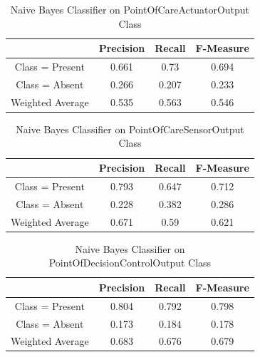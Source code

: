 \documentclass[11pt, notitlepage,abstracton,oneside]{article}   	%
\begin{document}
\begin{table}[H]
    \caption{Naive Bayes Classifier on PointOfCareActuatorOutput Class}
        \begin{center}
        \begin{tabular}{|c|c|c|c|}
            \hline
            & Precision & Recall & F-Measure \\ \hline
            Class = Present & 0.661 & 0.73 & 0.694 \\ \hline
            Class = Absent & 0.266 & 0.207 & 0.233 \\ \hline
            Weighted Average & 0.535 & 0.563 & 0.546 \\ \hline
        \end{tabular}
        \end{center}
    \label{default}
\end{table}%

\begin{table}[H]
    \caption{Naive Bayes Classifier on PointOfCareSensorOutput Class}
        \begin{center}
        \begin{tabular}{|c|c|c|c|}
            \hline
            & Precision & Recall & F-Measure \\ \hline
            Class = Present & 0.793 & 0.647 & 0.712 \\ \hline
            Class = Absent & 0.228 & 0.382 & 0.286 \\ \hline
            Weighted Average & 0.671 & 0.59 & 0.621 \\ \hline
        \end{tabular}
        \end{center}
    \label{default}
\end{table}%

\begin{table}[H]
    \caption{Naive Bayes Classifier on PointOfDecisionControlOutput Class}
        \begin{center}
        \begin{tabular}{|c|c|c|c|}
            \hline
            & Precision & Recall & F-Measure \\ \hline
            Class = Present & 0.804 & 0.792 & 0.798 \\ \hline
            Class = Absent & 0.173 & 0.184 & 0.178 \\ \hline
            Weighted Average & 0.683 & 0.676 & 0.679 \\ \hline
        \end{tabular}
        \end{center}
    \label{default}
\end{table}%
\end{document}
